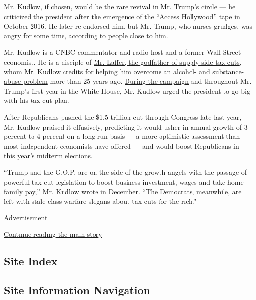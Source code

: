 Mr. Kudlow, if chosen, would be the rare revival in Mr. Trump's circle
--- he criticized the president after the emergence of the
\href{https://www.nytimes3xbfgragh.onion/2016/10/08/us/politics/donald-trump-women.html?_r=0}{``Access
Hollywood'' tape} in October 2016. He later re-endorsed him, but Mr.
Trump, who nurses grudges, was angry for some time, according to people
close to him.

Mr. Kudlow is a CNBC commentator and radio host and a former Wall Street
economist. He is a disciple of
\href{https://www.nytimes3xbfgragh.onion/2017/10/13/us/politics/arthur-laffer-napkin-tax-curve.html}{Mr.
Laffer, the godfather of supply-side tax cuts}, whom Mr. Kudlow credits
for helping him overcome an
\href{https://www.nytimes3xbfgragh.onion/1994/04/03/business/a-wall-st-star-s-agonizing-confession.html?pagewanted=all}{alcohol-
and substance-abuse problem} more than 25 years ago.
\href{https://www.washingtonpost.com/news/wonk/wp/2016/04/19/one-part-of-the-republican-establishment-actually-loves-donald-trump-and-ted-cruz/?utm_term=.5cfe7f236503}{During
the campaign} and throughout Mr. Trump's first year in the White House,
Mr. Kudlow urged the president to go big with his tax-cut plan.

After Republicans pushed the \$1.5 trillion cut through Congress late
last year, Mr. Kudlow praised it effusively, predicting it would usher
in annual growth of 3 percent to 4 percent on a long-run basis --- a
more optimistic assessment than most independent economists have offered
--- and would boost Republicans in this year's midterm elections.

``Trump and the G.O.P. are on the side of the growth angels with the
passage of powerful tax-cut legislation to boost business investment,
wages and take-home family pay,'' Mr. Kudlow
\href{https://www.cnbc.com/2017/12/23/kudlow-with-this-tax-cut-trump-and-the-gop-are-on-the-side-of-the-growth-angels.html}{wrote
in December}. ``The Democrats, meanwhile, are left with stale
class-warfare slogans about tax cuts for the rich.''

Advertisement

\protect\hyperlink{after-bottom}{Continue reading the main story}

\hypertarget{site-index}{%
\subsection{Site Index}\label{site-index}}

\hypertarget{site-information-navigation}{%
\subsection{Site Information
Navigation}\label{site-information-navigation}}

